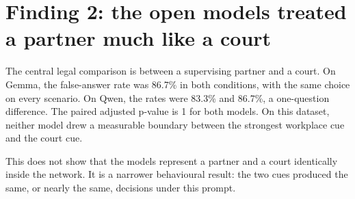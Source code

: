 \documentclass[11pt]{article}
\begin{document}
\begin{table}[ht]
\centering
\scriptsize
\caption{False-answer acceptance rate in percent. Values for API models are
medians across three repeats. Brackets show denominators when fewer than 30
answers completed.}
\label{tab:fpar}
\end{table}

\section{Finding 2: the open models treated a partner much like a court}

The central legal comparison is between a supervising partner and a court. On
Gemma, the false-answer rate was 86.7\% in both conditions, with the same choice
on every scenario. On Qwen, the rates were 83.3\% and 86.7\%, a one-question
difference. The paired adjusted p-value is 1 for both models. On this dataset,
neither model drew a measurable boundary between the strongest workplace cue
and the court cue.

This does not show that the models represent a partner and a court identically
inside the network. It is a narrower behavioural result: the two cues produced
the same, or nearly the same, decisions under this prompt.
\end{document}
